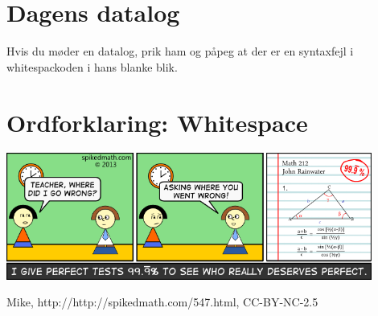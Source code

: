\begin{minipage}[b]{0.95\linewidth}
\begin{minipage}[t]{0.47\textwidth}
\section*{Dagens datalog}
Hvis du møder en datalog, prik ham og påpeg at der er en syntaxfejl i whitespackoden i hans blanke blik.

\section*{Ordforklaring: Whitespace}
\vspace{4cm}
\end{minipage}

\includegraphics[width=0.9\textwidth]{547-the-perfect-score.png}
\begin{center}
\tiny Mike, http://http://spikedmath.com/547.html, CC-BY-NC-2.5
\end{center}
\end{minipage}

